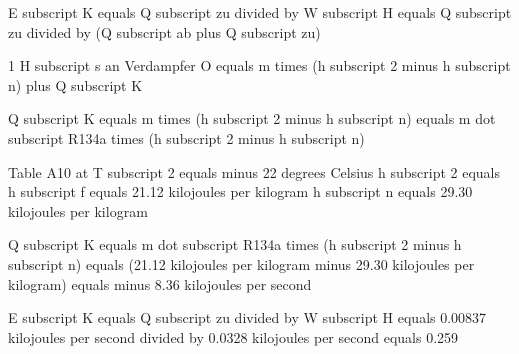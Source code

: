 E subscript K equals Q subscript zu divided by W subscript H equals Q subscript zu divided by (Q subscript ab plus Q subscript zu)  

1 H subscript s an Verdampfer  
O equals m times (h subscript 2 minus h subscript n) plus Q subscript K  

Q subscript K equals m times (h subscript 2 minus h subscript n) equals m dot subscript R134a times (h subscript 2 minus h subscript n)  

Table A10 at T subscript 2 equals minus 22 degrees Celsius  
h subscript 2 equals h subscript f equals 21.12 kilojoules per kilogram  
h subscript n equals 29.30 kilojoules per kilogram  

Q subscript K equals m dot subscript R134a times (h subscript 2 minus h subscript n) equals (21.12 kilojoules per kilogram minus 29.30 kilojoules per kilogram) equals minus 8.36 kilojoules per second  

E subscript K equals Q subscript zu divided by W subscript H equals 0.00837 kilojoules per second divided by 0.0328 kilojoules per second equals 0.259